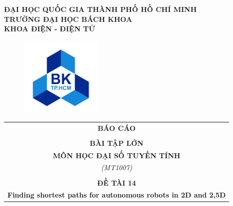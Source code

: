 \documentclass[a4paper]{article}
\theoremstyle{definition}
\begin{document}
\begin{titlepage}

\begin{center}
\LARGE \textbf{ĐẠI HỌC QUỐC GIA THÀNH PHỐ HỒ CHÍ MINH} \\
\vspace{0.2cm}
\LARGE \textbf{TRƯỜNG ĐẠI HỌC BÁCH KHOA} \\
\vspace{0.2cm}
\LARGE \textbf{KHOA ĐIỆN - ĐIỆN TỬ}
\end{center}

\vspace{0.3cm}

\begin{figure}[h!]
\begin{center}
\includegraphics[width=4cm]{Images/1-hcmut.png}
\end{center}
\end{figure}

\begin{center}
\begin{tabular}{c}
\multicolumn{1}{c}{\textbf{{\LARGE BÁO CÁO}}}\\
\\{\textbf{{\LARGE BÀI TẬP LỚN}}}
\\{\textbf{{\LARGE MÔN HỌC ĐẠI SỐ TUYẾN TÍNH}}}
\\ \textit{(MT1007)}
\\
\\
\textbf{\LARGE ĐỀ TÀI 14}\\
\textbf{\Large Finding shortest paths for autonomous robots in 2D and 2,5D }


\end{tabular}
\end{center}
\end{titlepage}
\end{document}
